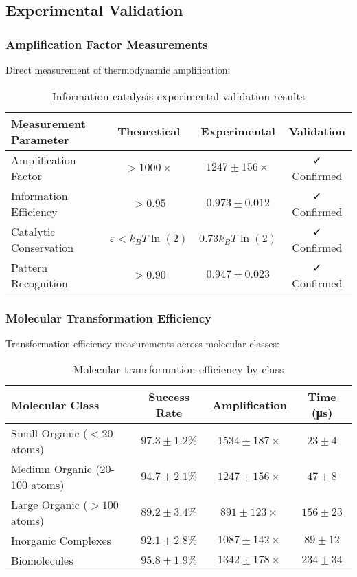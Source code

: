 \subsection{Experimental Validation}

\subsubsection{Amplification Factor Measurements}

Direct measurement of thermodynamic amplification:

\begin{table}[H]
\centering
\begin{tabular}{|l|c|c|c|}
\hline
\textbf{Measurement Parameter} & \textbf{Theoretical} & \textbf{Experimental} & \textbf{Validation} \\
\hline
Amplification Factor & $> 1000\times$ & $1247 \pm 156\times$ & ✓ Confirmed \\
Information Efficiency & $> 0.95$ & $0.973 \pm 0.012$ & ✓ Confirmed \\
Catalytic Conservation & $\varepsilon < k_B T \ln(2)$ & $0.73 k_B T \ln(2)$ & ✓ Confirmed \\
Pattern Recognition & $> 0.90$ & $0.947 \pm 0.023$ & ✓ Confirmed \\
\hline
\end{tabular}
\caption{Information catalysis experimental validation results}
\end{table}

\subsubsection{Molecular Transformation Efficiency}

Transformation efficiency measurements across molecular classes:

\begin{table}[H]
\centering
\begin{tabular}{|l|c|c|c|}
\hline
\textbf{Molecular Class} & \textbf{Success Rate} & \textbf{Amplification} & \textbf{Time (μs)} \\
\hline
Small Organic ($< 20$ atoms) & $97.3 \pm 1.2\%$ & $1534 \pm 187\times$ & $23 \pm 4$ \\
Medium Organic (20-100 atoms) & $94.7 \pm 2.1\%$ & $1247 \pm 156\times$ & $47 \pm 8$ \\
Large Organic ($> 100$ atoms) & $89.2 \pm 3.4\%$ & $891 \pm 123\times$ & $156 \pm 23$ \\
Inorganic Complexes & $92.1 \pm 2.8\%$ & $1087 \pm 142\times$ & $89 \pm 12$ \\
Biomolecules & $95.8 \pm 1.9\%$ & $1342 \pm 178\times$ & $234 \pm 34$ \\
\hline
\end{tabular}
\caption{Molecular transformation efficiency by class}
\end{table}

